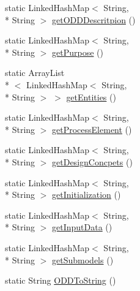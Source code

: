 \begin{DoxyCompactItemize}
\item 
static Linked\-Hash\-Map$<$ String, \\*
String $>$ \hyperlink{classit_1_1isislab_1_1masonassisteddocumentation_1_1_o_d_d_1_1_o_d_d_information_as_string_a84349581433f1d4029f6414a00af3010}{get\-O\-D\-D\-Descritpion} ()
\item 
static Linked\-Hash\-Map$<$ String, \\*
String $>$ \hyperlink{classit_1_1isislab_1_1masonassisteddocumentation_1_1_o_d_d_1_1_o_d_d_information_as_string_a42e8bef66af72b7de855d5a8acc2e26d}{get\-Purpose} ()
\item 
static Array\-List\\*
$<$ Linked\-Hash\-Map$<$ String, \\*
String $>$ $>$ \hyperlink{classit_1_1isislab_1_1masonassisteddocumentation_1_1_o_d_d_1_1_o_d_d_information_as_string_ae2ebf1ddf1e3327b64e6ac1a937ede8f}{get\-Entities} ()
\item 
static Linked\-Hash\-Map$<$ String, \\*
String $>$ \hyperlink{classit_1_1isislab_1_1masonassisteddocumentation_1_1_o_d_d_1_1_o_d_d_information_as_string_ab7a2dbd74cc8e7dec83e07df1aedc579}{get\-Process\-Element} ()
\item 
static Linked\-Hash\-Map$<$ String, \\*
String $>$ \hyperlink{classit_1_1isislab_1_1masonassisteddocumentation_1_1_o_d_d_1_1_o_d_d_information_as_string_a8ea3455b80112a986f25426327836b85}{get\-Design\-Concpets} ()
\item 
static Linked\-Hash\-Map$<$ String, \\*
String $>$ \hyperlink{classit_1_1isislab_1_1masonassisteddocumentation_1_1_o_d_d_1_1_o_d_d_information_as_string_aa3767e51964fecba08ec6e1669b77691}{get\-Initialization} ()
\item 
static Linked\-Hash\-Map$<$ String, \\*
String $>$ \hyperlink{classit_1_1isislab_1_1masonassisteddocumentation_1_1_o_d_d_1_1_o_d_d_information_as_string_ad985c38c6a682325207c66b3a1cd0c33}{get\-Input\-Data} ()
\item 
static Linked\-Hash\-Map$<$ String, \\*
String $>$ \hyperlink{classit_1_1isislab_1_1masonassisteddocumentation_1_1_o_d_d_1_1_o_d_d_information_as_string_a52fb66cf9c8b32febdc259a2098cd774}{get\-Submodels} ()
\item 
static String \hyperlink{classit_1_1isislab_1_1masonassisteddocumentation_1_1_o_d_d_1_1_o_d_d_information_as_string_ab14896c1ad0c20f9895a802bef0283fa}{O\-D\-D\-To\-String} ()
\end{DoxyCompactItemize}

